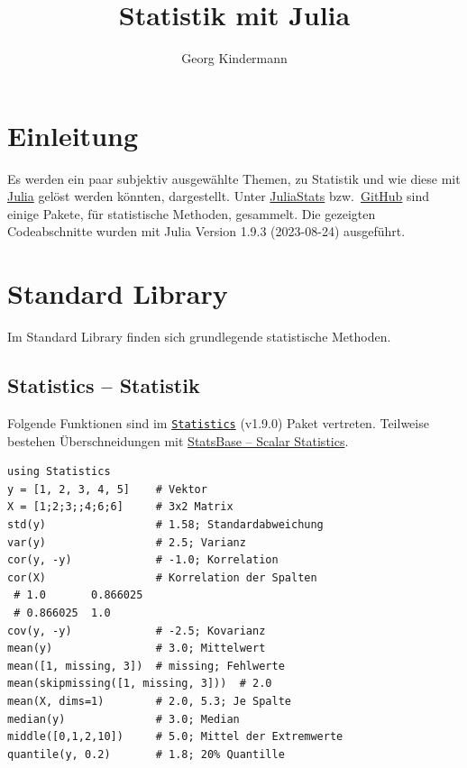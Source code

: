 \documentclass[10pt,twocolumn]{scrartcl}
\title{Statistik mit Julia}
\author{Georg Kindermann}
\begin{document}
\maketitle


\tableofcontents

\section{Einleitung}
\label{sec:einleitung}

Es werden ein paar subjektiv ausgewählte Themen, zu Statistik und wie diese mit
\href{https://julialang.org/}{Julia} gelöst werden könnten, dargestellt. Unter
\href{https://juliastats.org/}{JuliaStats} bzw.\
\href{https://github.com/JuliaStats/}{GitHub} sind einige Pakete, für
statistische Methoden, gesammelt. Die gezeigten Codeabschnitte wurden mit Julia
Version 1.9.3 (2023-08-24) ausgeführt.

\section{Standard Library}
\label{sec:standardLibrary}

Im Standard Library finden sich grundlegende statistische Methoden.

\subsection{Statistics -- Statistik}
\label{ssec:standardLibrary_Statistics}

Folgende Funktionen sind im
\href{https://docs.julialang.org/en/v1/stdlib/Statistics/}{\lstinline|Statistics|}
(v1.9.0) Paket vertreten. Teilweise bestehen Überschneidungen mit
\hyperref[ssec:StatsBase_ScalarStatistics]{StatsBase -- Scalar Statistics}.

\begin{lstlisting}
using Statistics
y = [1, 2, 3, 4, 5]    # Vektor
X = [1;2;3;;4;6;6]     # 3x2 Matrix
std(y)                 # 1.58; Standardabweichung
var(y)                 # 2.5; Varianz
cor(y, -y)             # -1.0; Korrelation
cor(X)                 # Korrelation der Spalten
 # 1.0       0.866025
 # 0.866025  1.0
cov(y, -y)             # -2.5; Kovarianz
mean(y)                # 3.0; Mittelwert
mean([1, missing, 3])  # missing; Fehlwerte
mean(skipmissing([1, missing, 3]))  # 2.0
mean(X, dims=1)        # 2.0, 5.3; Je Spalte
median(y)              # 3.0; Median
middle([0,1,2,10])     # 5.0; Mittel der Extremwerte
quantile(y, 0.2)       # 1.8; 20% Quantille
\end{lstlisting}
\end{document}
